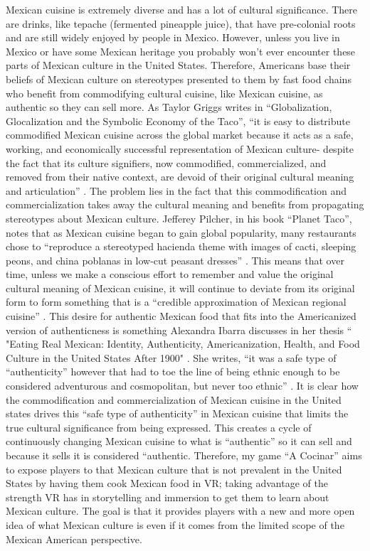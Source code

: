 \documentclass[10pt,twocolumn]{article}
\begin{document}
Mexican cuisine is extremely diverse and has a lot of cultural significance. There are drinks, like tepache (fermented pineapple juice), that have pre-colonial roots and are still widely enjoyed by people in Mexico. However, unless you live in Mexico or have some Mexican heritage you probably won’t ever encounter these parts of Mexican culture in the United States. Therefore, Americans base their beliefs of Mexican culture on stereotypes presented to them by fast food chains who benefit from commodifying cultural cuisine, like Mexican cuisine, as authentic so they can sell more. As Taylor Griggs writes in “Globalization, Glocalization and the Symbolic Economy of the Taco”, “it is easy to distribute commodified Mexican cuisine across the global market because it acts as a safe, working, and economically successful representation of Mexican culture- despite the fact that its culture signifiers, now commodified, commercialized, and removed from their native context, are devoid of their original cultural meaning and articulation” \cite{tacoEcon2017}. The problem lies in the fact that this commodification and commercialization takes away the cultural meaning and benefits from propagating stereotypes about Mexican culture. Jefferey Pilcher, in his book “Planet Taco”, notes that as Mexican cuisine began to gain global popularity, many restaurants chose to “reproduce a stereotyped hacienda theme with images of cacti, sleeping peons, and china poblanas in low-cut peasant dresses” \cite{planetTaco2012}. This means that over time, unless we make a conscious effort to remember and value the original cultural meaning of Mexican cuisine, it will continue to deviate from its original form to form something that is a “credible approximation of Mexican regional cuisine” \cite{planetTaco2012}. This desire for authentic Mexican food that fits into the Americanized version of authenticness is something Alexandra Ibarra discusses in her thesis “ "Eating Real Mexican: Identity, Authenticity, Americanization, Health, and Food Culture in the United States After 1900" \cite{realMex2022}. She writes, “it was a safe type of “authenticity” however that had to toe the line of being ethnic enough to be considered adventurous and cosmopolitan, but never too ethnic” \cite{realMex2022}. It is clear how the commodification and commercialization of Mexican cuisine in the United states drives this “safe type of authenticity” in Mexican cuisine that limits the true cultural significance from being expressed. This creates a cycle of continuously changing Mexican cuisine to what is “authentic” so it can sell and because it sells it is considered “authentic. Therefore, my game “A Cocinar” aims to expose players to that Mexican culture that is not prevalent in the United States by having them cook Mexican food in VR; taking advantage of the strength VR has in storytelling and immersion to get them to learn about Mexican culture. The goal is that it provides players with a new and more open idea of what Mexican culture is even if it comes from the limited scope of the Mexican American perspective.
 
\end{document}
